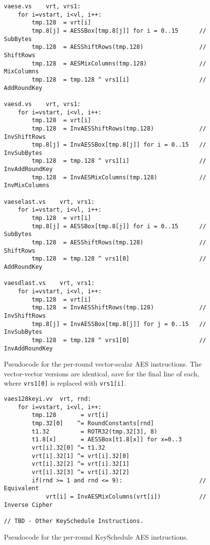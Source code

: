 \begin{figure}[h]
\begin{lstlisting}[language=pseudo]
vaese.vs    vrt, vrs1:
    for i=vstart, i<vl, i++:
        tmp.128  = vrt[i]
        tmp.8[j] = AESSBox[tmp.8[j]] for i = 0..15      // SubBytes
        tmp.128  = AESShiftRows(tmp.128)                // ShiftRows
        tmp.128  = AESMixColumns(tmp.128)               // MixColumns
        tmp.128  = tmp.128 ^ vrs1[i]                    // AddRoundKey

vaesd.vs    vrt, vrs1:
    for i=vstart, i<vl, i++:
        tmp.128  = vrt[i]
        tmp.128  = InvAESShiftRows(tmp.128)             // InvShiftRows
        tmp.8[j] = InvAESSBox[tmp.8[j]] for i = 0..15   // InvSubBytes
        tmp.128  = tmp.128 ^ vrs1[i]                    // InvAddRoundKey
        tmp.128  = InvAESMixColumns(tmp.128)            // InvMixColumns

vaeselast.vs    vrt, vrs1:
    for i=vstart, i<vl, i++:
        tmp.128  = vrt[i]
        tmp.8[j] = AESSBox[tmp.8[j]] for i = 0..15      // SubBytes
        tmp.128  = AESShiftRows(tmp.128)                // ShiftRows
        tmp.128  = tmp.128 ^ vrs1[0]                    // AddRoundKey

vaesdlast.vs    vrt, vrs1:
    for i=vstart, i<vl, i++:
        tmp.128  = vrt[i]
        tmp.128  = InvAESShiftRows(tmp.128)             // InvShiftRows
        tmp.8[j] = InvAESSBox[tmp.8[j]] for j = 0..15   // InvSubBytes
        tmp.128  = tmp.128 ^ vrs1[0]                    // InvAddRoundKey
\end{lstlisting}
\caption{Pseudocode for the per-round vector-scalar AES instructions.
The vector-vector versions are identical, save for the final
line of each, where {\tt vrs1[0]} is replaced with {\tt vrs1[i]}.}
\label{fig:pseudo:aes:vector:per-round}
\end{figure}

\begin{figure}[h]
\begin{lstlisting}[language=pseudo]
vaes128keyi.vv  vrt, rnd:
    for i=vstart, i<vl, i++:
        tmp.128       = vrt[i]
        tmp.32[0]    ^= RoundConstants[rnd]
        t1.32         = ROTR32(tmp.32[3], 8)
        t1.8[x]       = AESSBox[t1.8[x]] for x=0..3
        vrt[i].32[0] ^= t1.32
        vrt[i].32[1] ^= vrt[i].32[0]
        vrt[i].32[2] ^= vrt[i].32[1]
        vrt[i].32[3] ^= vrt[i].32[2]
        if(rnd >= 1 and rnd <= 9):                      // Equivalent
            vrt[i] = InvAESMixColumns(vrt[i])           // Inverse Cipher
	
// TBD - Other KeySchedule Instructions.
\end{lstlisting}
\caption{Pseudocode for the per-round KeySchedule AES instructions.}
\label{fig:pseudo:aes:vector:per-round:ks}
\end{figure}



